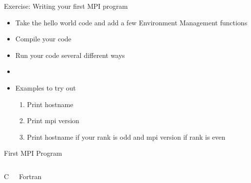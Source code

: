 \documentclass[10pt,t]{beamer}
\begin{document}

\begin{frame}{Exercise: Writing your first MPI program}
  \begin{itemize}
    \item Take the hello world code and add a few Environment Management functions
    \item Compile your code
    \item Run your code several different ways
    \item[]
    \item Examples to try out
      \begin{enumerate}
        \item Print hostname
        \item Print mpi version
        \item Print hostname if your rank is odd and mpi version if rank is even 
      \end{enumerate}
  \end{itemize}
\end{frame}

\begin{frame}{First MPI Program}
  \begin{columns}
    \vspace{-0.5cm}
    \begin{exampleblock}{C}
      
    \end{exampleblock}
    \vspace{-0.5cm}
    \begin{exampleblock}{Fortran}
      
    \end{exampleblock}
  \end{columns}
\end{frame}
\end{document}
